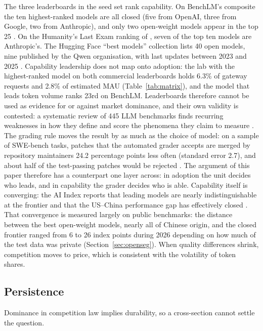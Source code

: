 \documentclass[11pt]{article}
\begin{document}
The three leaderboards in the seed set rank capability. On BenchLM's composite the ten highest-ranked models are all closed (five from OpenAI, three from Google, two from Anthropic), and only two open-weight models appear in the top 25 \cite{benchlm2026}. On the Humanity's Last Exam ranking of \cite{llmleaderboard2026}, seven of the top ten models are Anthropic's. The Hugging Face ``best models'' collection lists 40 open models, nine published by the Qwen organisation, with last updates between 2023 and 2025 \cite{hf2026collection}. Capability leadership does not map onto adoption: the lab with the highest-ranked model on both commercial leaderboards holds 6.3\% of gateway requests and 2.8\% of estimated MAU (Table~\ref{tab:matrix}), and the model that leads token volume ranks 23rd on BenchLM. Leaderboards therefore cannot be used as evidence for or against market dominance, and their own validity is contested: a systematic review of 445 LLM benchmarks finds recurring weaknesses in how they define and score the phenomena they claim to measure \cite{bean2025measuring}. The grading rule moves the result by as much as the choice of model: on a sample of {SWE-bench} tasks, patches that the automated grader accepts are merged by repository maintainers 24.2 percentage points less often (standard error 2.7), and about half of the test-passing patches would be rejected \cite{metr2026swebench}. The argument of this paper therefore has a counterpart one layer across: in adoption the unit decides who leads, and in capability the grader decides who is able. Capability itself is converging: the AI Index reports that leading models are nearly indistinguishable at the frontier and that the US--China performance gap has effectively closed \cite{aiindex2026}. That convergence is measured largely on public benchmarks: the distance between the best open-weight models, nearly all of Chinese origin, and the closed frontier ranged from 6 to 26 index points during 2026 depending on how much of the test data was private (Section~\ref{sec:openseg}). When quality differences shrink, competition moves to price, which is consistent with the volatility of token shares.

\subsection{Persistence}
\label{sec:persist}

Dominance in competition law implies durability, so a cross-section cannot settle the question.
\end{document}
